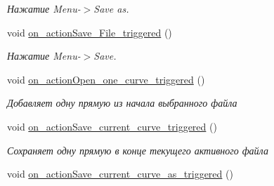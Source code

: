 \begin{DoxyCompactItemize}
\begin{DoxyCompactList}\small\item\em Нажатие Menu-\/$>$Save as. \end{DoxyCompactList}\item 
void \hyperlink{class_main_window_ab389ed5a61b95186643e6966ba965d5f}{on\+\_\+action\+Save\+\_\+\+File\+\_\+triggered} ()\hypertarget{class_main_window_ab389ed5a61b95186643e6966ba965d5f}{}\label{class_main_window_ab389ed5a61b95186643e6966ba965d5f}

\begin{DoxyCompactList}\small\item\em Нажатие Menu-\/$>$Save. \end{DoxyCompactList}\item 
void \hyperlink{class_main_window_a0c0436c2de50da0d7cf5b26242a694ad}{on\+\_\+action\+Open\+\_\+one\+\_\+curve\+\_\+triggered} ()\hypertarget{class_main_window_a0c0436c2de50da0d7cf5b26242a694ad}{}\label{class_main_window_a0c0436c2de50da0d7cf5b26242a694ad}

\begin{DoxyCompactList}\small\item\em Добавляет одну прямую из начала выбранного файла \end{DoxyCompactList}\item 
void \hyperlink{class_main_window_adb1ff161c75d24a3aa5d5aa71e3cbb91}{on\+\_\+action\+Save\+\_\+current\+\_\+curve\+\_\+triggered} ()\hypertarget{class_main_window_adb1ff161c75d24a3aa5d5aa71e3cbb91}{}\label{class_main_window_adb1ff161c75d24a3aa5d5aa71e3cbb91}

\begin{DoxyCompactList}\small\item\em Сохраняет одну прямую в конце текущего активного файла \end{DoxyCompactList}\item 
void \hyperlink{class_main_window_ad0e13c15f3efed36489c68de4bb6434f}{on\+\_\+action\+Save\+\_\+current\+\_\+curve\+\_\+as\+\_\+triggered} ()
\end{DoxyCompactItemize}

